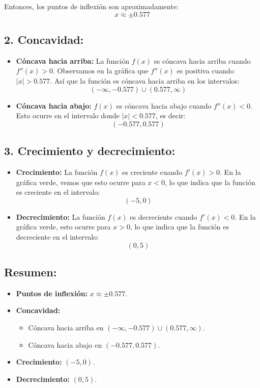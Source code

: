 \documentclass[11pt,letterpaper]{article}
\begin{document}
Entonces, los puntos de inflexión son aproximadamente:
\[
x \approx \pm 0.577
\]

\subsection*{2. Concavidad:}

\begin{itemize}
    \item \textbf{Cóncava hacia arriba:} La función \( f(x) \) es cóncava hacia arriba cuando \( f''(x) > 0 \). Observamos en la gráfica que \( f''(x) \) es positiva cuando \( |x| > 0.577 \). Así que la función es cóncava hacia arriba en los intervalos:
    \[
    (-\infty, -0.577) \cup (0.577, \infty)
    \]
    
    \item \textbf{Cóncava hacia abajo:} \( f(x) \) es cóncava hacia abajo cuando \( f''(x) < 0 \). Esto ocurre en el intervalo donde \( |x| < 0.577 \), es decir:
    \[
    (-0.577, 0.577)
    \]
\end{itemize}

\subsection*{3. Crecimiento y decrecimiento:}

\begin{itemize}
    \item \textbf{Crecimiento:} La función \( f(x) \) es creciente cuando \( f'(x) > 0 \). En la gráfica verde, vemos que esto ocurre para \( x < 0 \), lo que indica que la función es creciente en el intervalo:
    \[
    (-5, 0)
    \]
    
    \item \textbf{Decrecimiento:} La función \( f(x) \) es decreciente cuando \( f'(x) < 0 \). En la gráfica verde, esto ocurre para \( x > 0 \), lo que indica que la función es decreciente en el intervalo:
    \[
    (0, 5)
    \]
\end{itemize}

\subsection*{Resumen:}

\begin{itemize}
    \item \textbf{Puntos de inflexión:} \( x \approx \pm 0.577 \).
    \item \textbf{Concavidad:}
    \begin{itemize}
        \item Cóncava hacia arriba en \( (-\infty, -0.577) \cup (0.577, \infty) \).
        \item Cóncava hacia abajo en \( (-0.577, 0.577) \).
    \end{itemize}
    \item \textbf{Crecimiento:} \( (-5, 0) \).
    \item \textbf{Decrecimiento:} \( (0, 5) \).
\end{itemize}
\end{document}

